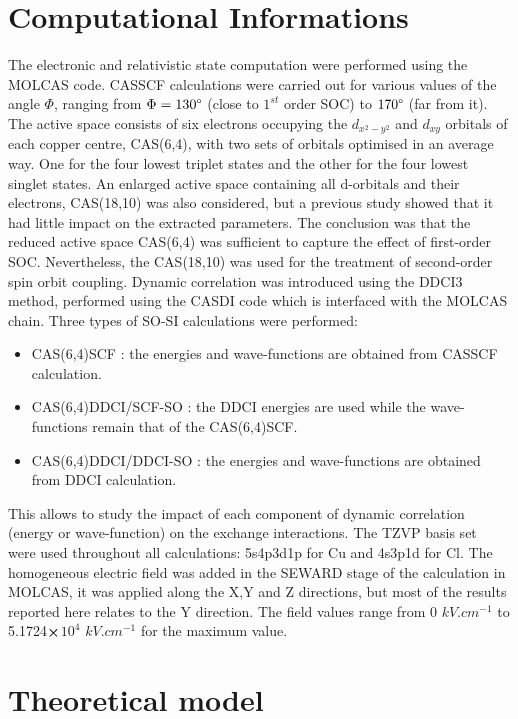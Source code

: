 \documentclass[12pt,a4paper]{report}
\numberwithin{equation}{section}
\begin{document}
\section{Computational Informations}

The electronic and relativistic state computation were performed using the MOLCAS code\cite{aquilante_molcas_2010}.
CASSCF calculations were carried out for various values of the angle $\Phi$, ranging from $\Phi=130\degree$ (close to $1^{st}$ order SOC) to $170\degree$ (far from it).
The active space consists of six electrons occupying the $d_{x^2-y^2}$ and $d_{xy}$ orbitals of each copper centre, CAS(6,4), with two sets of orbitals optimised in an average way.
One for the four lowest triplet states and the other for the four lowest singlet states.
An enlarged active space containing all d-orbitals and their electrons, CAS(18,10) was also considered, but a previous study showed that it had little impact on the extracted parameters. The conclusion was that the reduced active space CAS(6,4) was sufficient to capture the effect of first-order SOC.
Nevertheless, the CAS(18,10) was used for the treatment of second-order spin orbit coupling.
Dynamic correlation was introduced using the DDCI3 method, performed using the CASDI code\cite{ben_amor_direct_2011} which is interfaced with the MOLCAS chain.
Three types of SO-SI calculations were performed:
\begin{itemize}
    \item[(i)] CAS(6,4)SCF : the energies and wave-functions are obtained from CASSCF calculation.
    \item[(ii)] CAS(6,4)DDCI/SCF-SO : the DDCI energies are used while the wave-functions remain that of the CAS(6,4)SCF.
    \item[(iii)] CAS(6,4)DDCI/DDCI-SO : the energies and wave-functions are obtained from DDCI calculation.
\end{itemize}
This allows to study the impact of each component of dynamic correlation (energy or wave-function) on the exchange interactions.
The TZVP basis set~\cite{roos_main_2004} were used throughout all calculations: 5s4p3d1p for Cu and 4s3p1d for Cl.
The homogeneous electric field was added in the SEWARD stage of the calculation in MOLCAS, it was applied along the X,Y and Z directions, but most of the results reported here relates to the Y direction.
The field values range from 0 $kV.cm^{-1}$ to 5.1724$\cross$$10^4$ $kV.cm^{-1}$ for the maximum value.
\section{Theoretical model}
\end{document}
